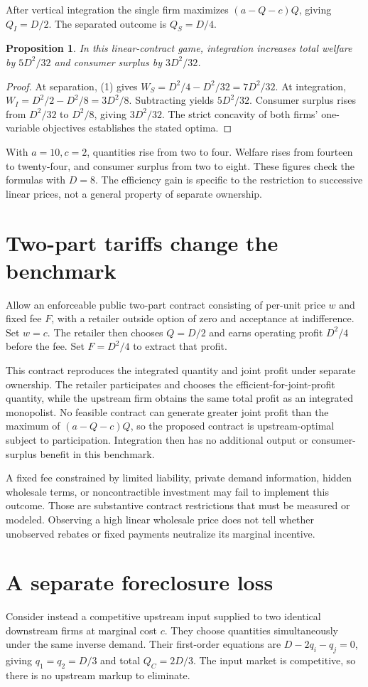 \documentclass[11pt,a4paper]{article}
\newtheorem{proposition}[theorem]{Proposition}
\begin{document}
After vertical integration the single firm maximizes $(a-Q-c)Q$, giving $Q_I=D/2$. The separated outcome is $Q_S=D/4$.
\begin{proposition}
In this linear-contract game, integration increases total welfare by $5D^2/32$ and consumer surplus by $3D^2/32$.
\end{proposition}
\begin{proof}
At separation, (1) gives
$W_S=D^2/4-D^2/32=7D^2/32$.
At integration, $W_I=D^2/2-D^2/8=3D^2/8$.
Subtracting yields $5D^2/32$. Consumer surplus rises from $D^2/32$ to $D^2/8$, giving $3D^2/32$. The strict concavity of both firms' one-variable objectives establishes the stated optima.
\end{proof}
With $a=10,c=2$, quantities rise from two to four. Welfare rises from fourteen to twenty-four, and consumer surplus from two to eight. These figures check the formulas with $D=8$. The efficiency gain is specific to the restriction to successive linear prices, not a general property of separate ownership.
\section{Two-part tariffs change the benchmark}
Allow an enforceable public two-part contract consisting of per-unit price $w$ and fixed fee $F$, with a retailer outside option of zero and acceptance at indifference. Set $w=c$. The retailer then chooses $Q=D/2$ and earns operating profit $D^2/4$ before the fee. Set $F=D^2/4$ to extract that profit.

This contract reproduces the integrated quantity and joint profit under separate ownership. The retailer participates and chooses the efficient-for-joint-profit quantity, while the upstream firm obtains the same total profit as an integrated monopolist. No feasible contract can generate greater joint profit than the maximum of $(a-Q-c)Q$, so the proposed contract is upstream-optimal subject to participation. Integration then has no additional output or consumer-surplus benefit in this benchmark.

A fixed fee constrained by limited liability, private demand information, hidden wholesale terms, or noncontractible investment may fail to implement this outcome. Those are substantive contract restrictions that must be measured or modeled. Observing a high linear wholesale price does not tell whether unobserved rebates or fixed payments neutralize its marginal incentive.
\section{A separate foreclosure loss}
Consider instead a competitive upstream input supplied to two identical downstream firms at marginal cost $c$. They choose quantities simultaneously under the same inverse demand. Their first-order equations are $D-2q_i-q_j=0$, giving $q_1=q_2=D/3$ and total $Q_C=2D/3$. The input market is competitive, so there is no upstream markup to eliminate.
\end{document}
